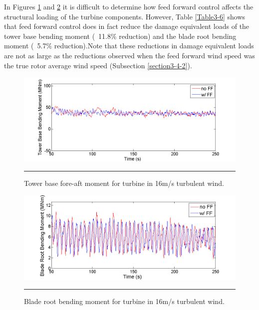 In Figures \ref{fig3-34} and \ref{fig3-35} it is difficult to determine how feed forward control affects the structural loading of the turbine components. However, Table \ref{Table3-6} shows that feed forward control does in fact reduce the damage equivalent loads of the tower base bending moment (~11.8$\%$ reduction) and the blade root bending moment (~5.7$\%$ reduction).Note that these reductions in damage equivalent loads are not as large as the reductions observed when the feed forward wind speed was the true rotor average wind speed (Subsection \ref{section3-4-2}). 

\begin{figure}[htbp]
	\centering
		\includegraphics[trim = {1cm 0 2cm 0}, clip, width = \linewidth]{Figures/ch3Figures/fig3-34.png}
		\rule{35em}{0.5pt}
	\caption{Tower base fore-aft moment for turbine in 16m/s turbulent wind.}
	\label{fig3-34}
\end{figure}

\begin{figure}[htbp]
	\centering
		\includegraphics[trim = {1cm 0 2cm 0}, clip, width = \linewidth]{Figures/ch3Figures/fig3-35.png}
		\rule{35em}{0.5pt}
	\caption{Blade root bending moment for turbine in 16m/s turbulent wind.}
	\label{fig3-35}
\end{figure}


